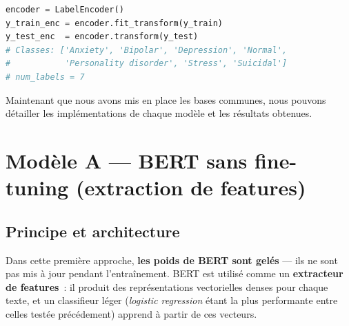 \documentclass[12pt,a4paper]{report}
\begin{document}
\begin{lstlisting}[language=Python]
encoder = LabelEncoder()
y_train_enc = encoder.fit_transform(y_train)
y_test_enc  = encoder.transform(y_test)
# Classes: ['Anxiety', 'Bipolar', 'Depression', 'Normal',
#           'Personality disorder', 'Stress', 'Suicidal']
# num_labels = 7
\end{lstlisting}

Maintenant que nous avons mis en place les bases communes, nous pouvons détailler les implémentations de chaque modèle et les résultats obtenues.

\pagebreak


\section{Modèle A — BERT sans fine-tuning (extraction de features)}

\subsection{Principe et architecture}

Dans cette première approche, \textbf{les poids de BERT sont gelés} — ils ne sont pas
mis à jour pendant l'entraînement. BERT est utilisé comme un
\textbf{extracteur de features}~: il produit des représentations vectorielles denses pour
chaque texte, et un classifieur léger (\textit{logistic regression} 
étant la plus performante entre celles testée précédement) apprend à partir de ces vecteurs.
\end{document}

